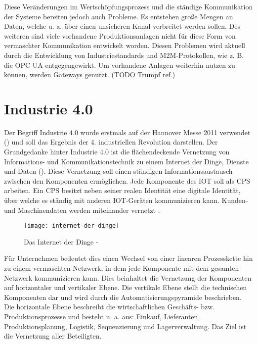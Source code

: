 Diese Veränderungen im Wertschöpfungsprozess und die ständige Kommunikation der Systeme bereiten jedoch auch Probleme. Es entstehen große Mengen an Daten, welche u. a. über einen unsicheren Kanal verbreitet werden sollen. Des weiteren sind viele vorhandene Produktionsanlagen nicht für diese Form von vermaschter Kommunikation entwickelt worden. Diesen Problemen wird aktuell durch die Entwicklung von Industriestandards und \ac{M2M}-Protokollen, wie z. B. die \ac{OPC UA} entgegengewirkt. Um vorhandene Anlagen weiterhin nutzen zu können, werden Gateways genutzt. (TODO Trumpf ref.)

\section{Industrie 4.0}

Der Begriff Industrie 4.0 wurde erstmals auf der Hannover Messe 2011 verwendet (\cite{drath2014}) und soll das Ergebnis der 4. industriellen Revolution darstellen. Der Grundgedanke hinter Industrie 4.0 ist die flächendeckende Vernetzung von Informations- und Kommunikationstechnik zu einem Internet der Dinge, Dienste und Daten (\cite{Spath2013}). Diese Vernetzung soll einen ständigen Informationsaustausch zwischen den Komponenten ermöglichen. Jede Komponente des \ac{IOT} soll als \ac{CPS} arbeiten. Ein \ac{CPS} besitzt neben seiner realen Identität eine digitale Identität, über welche es ständig mit anderen \ac{IOT}-Geräten kommunizieren kann. Kunden- und Maschinendaten werden miteinander vernetzt \cite{rami2016}.

\begin{figure}[h]
  \centering
  \texttt{[image: internet-der-dinge]}
  \caption{Das Internet der Dinge - \cite{rami2016}}
  \label{Kap2:Das Internet der Dinge}
\end{figure}

\clearpage

Für Unternehmen bedeutet dies einen Wechsel von einer linearen Prozesskette hin zu einem vermaschten Netzwerk, in dem jede Komponente mit dem gesamten Netzwerk kommunizieren kann. Dies beinhaltet die Vernetzung der Komponenten auf horizontaler und vertikaler Ebene. Die vertikale Ebene stellt die technischen Komponenten dar und wird durch die Automatisierungspyramide beschrieben. Die horizontale Ebene beschreibt die wirtschaftlichen Geschäfts- bzw. Produktionsprozesse und besteht u. a. aus: Einkauf, Lieferanten, Produktionsplanung, Logistik, Sequenzierung und Lagerverwaltung. Das Ziel ist die Vernetzung aller Beteiligten.

